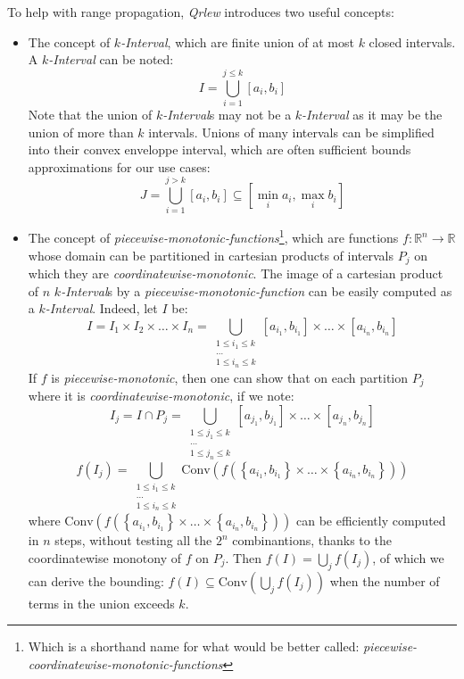 \documentclass[letterpaper]{article} %
\newcommand{\qrlew}{\emph{Qrlew}}
\begin{document}
To help with range propagation, \qrlew{} introduces two useful concepts:
\begin{itemize}
    \item The concept of \emph{$k$-Interval}, which are finite union of at most $k$ closed intervals. A \emph{$k$-Interval} can be noted:
    $$I = \bigcup_{i=1}^{j\leq k}\left[a_i, b_i\right]$$
    Note that the union of \emph{$k$-Interval}s may not be a \emph{$k$-Interval} as it may be the union of more than $k$ intervals.
    Unions of many intervals can be simplified into their convex enveloppe interval, which are often sufficient bounds approximations for our use cases:
    $$J = \bigcup_{i=1}^{j> k}\left[a_i, b_i\right] \subseteq \left[\min_i a_i, \max_i b_i\right]$$
    \item The concept of \emph{piecewise-monotonic-functions}\footnote{Which is a shorthand name for what would be better called: \emph{piecewise-coordinatewise-monotonic-functions}}, which are functions $f: \mathbb{R}^n \rightarrow \mathbb{R}$ whose domain can be partitioned in cartesian products of intervals $P_j$ on which they are \emph{coordinatewise-monotonic}.
    The image of a cartesian product of $n$ \emph{$k$-Interval}s by a \emph{piecewise-monotonic-function} can be easily computed as a \emph{$k$-Interval}.
    Indeed, let $I$ be:
    $$I = I_1\times I_2\times \ldots \times I_n = \bigcup_{\substack{1\leq i_1\leq k\\\ldots\\1\leq i_n\leq k}}\left[a_{i_1}, b_{i_1}\right]\times \ldots \times \left[a_{i_n}, b_{i_n}\right]$$
    If $f$ is \emph{piecewise-monotonic}, then one can show that on each partition $P_j$ where it is \emph{coordinatewise-monotonic}, if we note:
    $$I_j = I \cap P_j = \bigcup_{\substack{1\leq j_1\leq k\\\ldots\\1\leq j_n\leq k}}\left[a_{j_1}, b_{j_1}\right]\times \ldots \times \left[a_{j_n}, b_{j_n}\right]$$
    $$f(I_j) = \bigcup_{\substack{1\leq i_1\leq k\\\ldots\\1\leq i_n\leq k}}\text{Conv}\left(f\left( \left\{a_{i_1}, b_{i_1}\right\}\times \ldots \times \left\{a_{i_n}, b_{i_n}\right\}\right)\right)$$
    where $\text{Conv}\left(f\left( \left\{a_{i_1}, b_{i_1}\right\}\times \ldots \times \left\{a_{i_n}, b_{i_n}\right\}\right)\right)$ can be efficiently computed in $n$ steps, without testing all the $2^n$ combinantions, thanks to the coordinatewise monotony of $f$ on $P_j$.
    Then $f(I) = \bigcup_j f(I_j)$, of which we can derive the bounding: $f(I) \subseteq \text{Conv}\left(\bigcup_j f(I_j)\right)$ when the number of terms in the union exceeds $k$.
\end{itemize}
\end{document}
